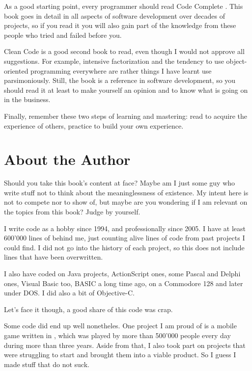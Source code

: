 As a good starting point, every programmer should read Code Complete
\cite{code-complete}. This book goes in detail in all aspects of
software development over decades of projects, so if you read it you
will also gain part of the knowledge from these people who tried and
failed before you.

Clean Code \cite{clean-code} is a good second book to read, even
though I would not approve all suggestions. For example, intensive
factorization and the tendency to use object-oriented programming
everywhere are rather things I have learnt use parsimoniously. Still,
the book is a reference in software development, so you should read it
at least to make yourself an opinion and to know what is going on in
the business.

\bigskip

Finally, remember these two steps of learning and mastering: read to
acquire the experience of others, practice to build your own
experience.

\section{About the Author}

Should you take this book's content at face? Maybe am I just some guy
who write stuff not to think about the meaninglessness of
existence. My intent here is not to compete nor to show of, but maybe
are you wondering if I am relevant on the topics from this book? Judge
by yourself.

I write code as a hobby since 1994, and professionally since 2005. I
have at least 600'000 lines of \cpp behind me, just counting alive
lines of code from past projects I could find. I did not go into the
history of each project, so this does not include lines that have been
overwritten.

I also have coded on Java projects, ActionScript ones, some Pascal and
Delphi ones, Visual Basic too, BASIC a long time ago, on a Commodore
128 and later under DOS. I did also a bit of Objective-C.

Let's face it though, a good share of this code was crap.

Some code did end up well nonetheles. One project I am proud of is a
mobile game written in \cpp, which was played by more than 500'000
people every day during more than three years. Aside from that, I also
took part on projects that were struggling to start and brought them
into a viable product. So I guess I made stuff that do not suck.

